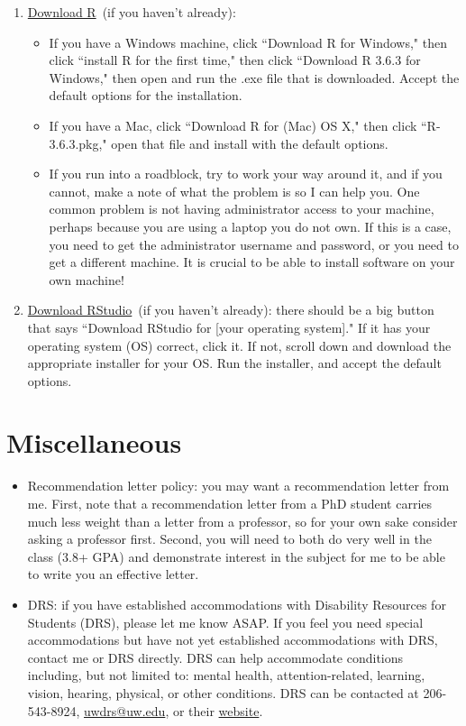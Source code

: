 \documentclass[12pt]{article}
\begin{document}
\begin{enumerate}
	\item \href{https://cran.rstudio.com/}{Download R} (if you haven't already):
	\begin{itemize}
		\item If you have a Windows machine, click ``Download R for Windows," then click ``install R for the first time," then click ``Download R 3.6.3 for Windows," then open and run the .exe file that is downloaded. Accept the default options for the installation.
		\item If you have a Mac, click ``Download R for (Mac) OS X," then click ``R-3.6.3.pkg," open that file and install with the default options.
		\item If you run into a roadblock, try to work your way around it, and if you cannot, make a note of what the problem is so I can help you. One common problem is not having administrator access to your machine, perhaps because you are using a laptop you do not own. If this is a case, you need to get the administrator username and password, or you need to get a different machine. It is crucial to be able to install software on your own machine!
	\end{itemize}
	\item \href{https://rstudio.com/products/rstudio/download/#download}{Download RStudio} (if you haven't already): there should be a big button that says ``Download RStudio for [your operating system]." If it has your operating system (OS) correct, click it. If not, scroll down and download the appropriate installer for your OS. Run the installer, and accept the default options.
\end{enumerate}

\section*{Miscellaneous}

\begin{itemize}
	\item Recommendation letter policy: you may want a recommendation letter from me. First, note that a recommendation letter from a PhD student carries much less weight than a letter from a professor, so for your own sake consider asking a professor first. Second, you will need to both do very well in the class (3.8+ GPA) and demonstrate interest in the subject for me to be able to write you an effective letter.
	\item DRS: if you have established accommodations with Disability Resources for Students (DRS), please let me know ASAP. If you feel you need special accommodations but have not yet established accommodations with DRS, contact me or DRS directly. DRS can help accommodate conditions including, but not limited to: mental health, attention-related, learning, vision, hearing, physical, or other conditions. DRS can be contacted at 206-543-8924, \href{mailto:uwdrs@uw.edu}{uwdrs@uw.edu}, or their \href{http://depts.washington.edu/uwdrs/}{website}.
\end{itemize}
\end{document}
